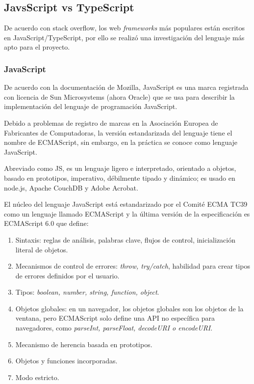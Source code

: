 \subsection{JavsScript vs TypeScript}

De acuerdo con stack overflow\cite{noauthor_most_nodate}, los web \textit{frameworks} más populares están escritos en JavaScript/TypeScript, por ello se realizó una investigación del lenguaje más apto para el proyecto.

\subsubsection*{JavaScript}
De acuerdo con la documentación de Mozilla\cite{noauthor_javascript_nodate}, JavaScript es una marca registrada con licencia de Sun Microsystems (ahora Oracle) que se usa para describir la implementación del lenguaje de programación JavaScript.


Debido a problemas de registro de marcas en la Asociación Europea de Fabricantes de Computadoras, la versión estandarizada del lenguaje tiene el nombre de ECMAScript, sin embargo, en la práctica se conoce como lenguaje JavaScript. 


Abreviado como JS, es un lenguaje ligero e interpretado, orientado a objetos, basado en prototipos, imperativo, débilmente tipado y dinámico; es usado en node.js, Apache CouchDB y Adobe Acrobat.


El núcleo del lenguaje JavaScript está estandarizado por el Comité ECMA TC39 como un lenguaje llamado ECMAScript y la última versión de la especificación es ECMAScript 6.0 que define: 

\begin{enumerate}
    \item Sintaxis: reglas de análisis, palabras clave, flujos de control, inicialización literal de objetos.
    \item Mecanismos de control de errores: \textit{throw, try/catch}, habilidad para crear tipos de errores definidos por el usuario.
    \item Tipos: \textit{boolean, number, string, function, object}.
    \item  Objetos globales: en un navegador, los objetos globales son los objetos de la ventana, pero ECMAScript solo define una API no específica para navegadores, como \textit{parseInt, parseFloat, decodeURI o encodeURI}.
    \item Mecanismo de herencia basada en prototipos.
    \item Objetos y funciones incorporadas.
    \item Modo estricto.
\end{enumerate}

